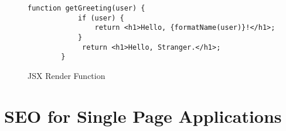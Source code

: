 \begin{figure}
    \begin{lstlisting}[style=htmlcssjs]
        function getGreeting(user) {
            if (user) {
                return <h1>Hello, {formatName(user)}!</h1>;
            }
             return <h1>Hello, Stranger.</h1>;
        }
    \end{lstlisting}
    \caption{JSX Render Function}
\end{figure}



\section{SEO for Single Page Applications}
